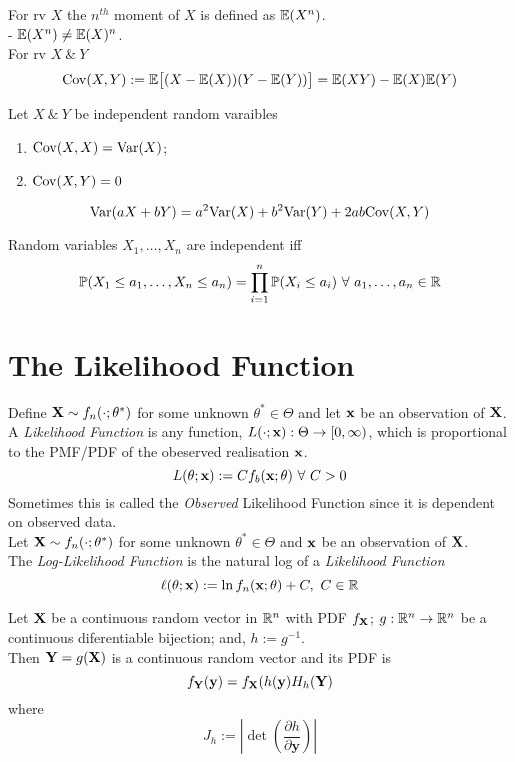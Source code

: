 \documentclass[11pt,a4paper]{article}
\begin{document}
For rv $X$ the $n^{th}$ moment of $X$ is defined as $\mathbb{E}(X^n)$.\\
\nb - $\mathbb{E}(X^n)\neq\mathbb{E}(X)^n$.\\

For rv $X\ \&\ Y$
$$\mathrm{Cov}(X,Y):=\mathbb{E}\big[(X-\mathbb{E}(X))(Y-\mathbb{E}(Y))\big]=\mathbb{E}(XY)-\mathbb{E}(X)\mathbb{E}(Y)$$

Let $X\ \&\ Y$ be independent random varaibles
\begin{enumerate}[label=\roman*)]
	\item $\mathrm{Cov}(X,X)=\mathrm{Var}(X)$;
	\item $\mathrm{Cov}(X,Y)=0$
\end{enumerate}

$$\mathrm{Var}(aX+bY)=a^2\mathrm{Var}(X)+b^2\mathrm{Var}(Y)+2ab\mathrm{Cov}(X,Y)$$

Random variables $X_1,\dots,X_n$ are independent iff
$$\prob(X_1\leq a_1,\dots,X_n\leq a_n)=\prod_{i=1}^n\prob(X_i\leq a_i)\ \forall\ a_1,\dots,a_n\in\reals$$


\section{The Likelihood Function}

Define $\textbf{X}\sim f_n(\cdot;\theta^*)$ for some unknown $\theta^*\in\Theta$ and let $\textbf{x}$ be an observation of $\textbf{X}$.\\
A \textit{Likelihood Function} is any function, $L(\cdot;\textbf{x}):\Theta\to[0,\infty)$, which is proportional to the PMF/PDF of the obeserved realisation $\textbf{x}$.
$$L(\theta;\x):=Cf_b(\x;\theta)\ \forall\ C>0$$
\nb Sometimes this is called the \textit{Observed} Likelihood Function since it is dependent on observed data.\\

Let $\textbf{X}\sim f_n(\cdot;\theta^*)$ for some unknown $\theta^*\in\Theta$ and $\textbf{x}$ be an observation of $\textbf{X}$.\\
The \textit{Log-Likelihood Function} is the natural log of a \textit{Likelihood Function}
$$\ell(\theta;\x):=\ln f_n(\x;\theta)+C,\ C\in\reals$$

Let $\textbf{X}$ be a continuous random vector in $\mathbb{R}^n$ with PDF $f_{\textbf{X}}$; $g:\mathbb{R}^n\to\mathbb{R}^n$ be a continuous diferentiable bijection; and, $h:=g^{-1}$.\\
Then $\textbf{Y}=g(\textbf{X})$ is a continuous random vector and its PDF is
$$f_{\textbf{Y}}(\textbf{y})=f_{\textbf{X}}(h(\textbf{y})H_h(\textbf{Y})$$
where
$$J_h:=\left|\det\left(\frac{\partial h}{\partial\textbf{y}}\right)\right|$$
\end{document}
